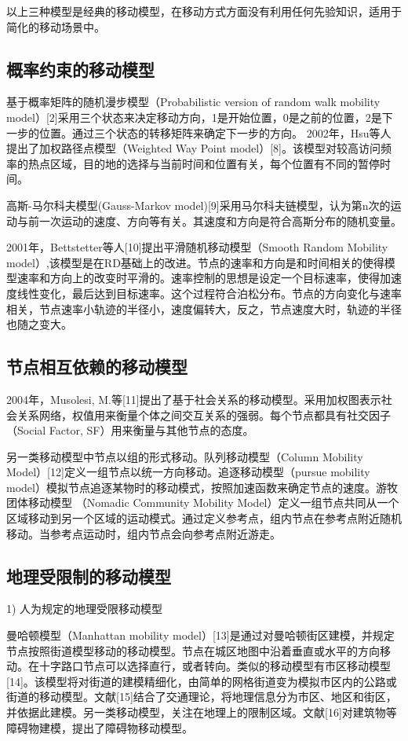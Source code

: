 以上三种模型是经典的移动模型，在移动方式方面没有利用任何先验知识，适用于简化的移动场景中。

\subsection{概率约束的移动模型}
    基于概率矩阵的随机漫步模型（Probabilistic version of random walk mobility model）[2]采用三个状态来决定移动方向，1是开始位置，0是之前的位置，2是下一步的位置。通过三个状态的转移矩阵来确定下一步的方向。
2002年，Hsu等人提出了加权路径点模型（Weighted Way Point model）[8]。该模型对较高访问频率的热点区域，目的地的选择与当前时间和位置有关，每个位置有不同的暂停时间。
	
	高斯-马尔科夫模型(Gauss-Markov model)[9]采用马尔科夫链模型，认为第n次的运动与前一次运动的速度、方向等有关。其速度和方向是符合高斯分布的随机变量。

2001年，Bettstetter等人[10]提出平滑随机移动模型（Smooth Random Mobility model）,该模型是在RD基础上的改进。节点的速率和方向是和时间相关的使得模型速率和方向上的改变时平滑的。速率控制的思想是设定一个目标速率，使得加速度线性变化，最后达到目标速率。这个过程符合泊松分布。节点的方向变化与速率相关，节点速率小轨迹的半径小，速度偏转大，反之，节点速度大时，轨迹的半径也随之变大。

\subsection{节点相互依赖的移动模型}
2004年，Musolesi, M.等[11]提出了基于社会关系的移动模型。采用加权图表示社会关系网络，权值用来衡量个体之间交互关系的强弱。每个节点都具有社交因子（Social Factor, SF）用来衡量与其他节点的态度。

另一类移动模型中节点以组的形式移动。队列移动模型（Column Mobility Model）[12]定义一组节点以统一方向移动。追逐移动模型（pursue mobility model）模拟节点追逐某物时的移动模式，按照加速函数来确定节点的速度。游牧团体移动模型
（Nomadic Community Mobility Model）定义一组节点共同从一个区域移动到另一个区域的运动模式。通过定义参考点，组内节点在参考点附近随机移动。当参考点运动时，组内节点会向参考点附近游走。

\subsection{地理受限制的移动模型}

  1) 人为规定的地理受限移动模型

曼哈顿模型（Manhattan mobility model）[13]是通过对曼哈顿街区建模，并规定节点按照街道模型移动的移动模型。节点在城区地图中沿着垂直或水平的方向移动。在十字路口节点可以选择直行，或者转向。类似的移动模型有市区移动模型[14]。该模型将对街道的建模精细化，由简单的网格街道变为模拟市区内的公路或街道的移动模型。文献[15]结合了交通理论，将地理信息分为市区、地区和街区，并依据此建模。另一类移动模型，关注在地理上的限制区域。文献[16]对建筑物等障碍物建模，提出了障碍物移动模型。
 
